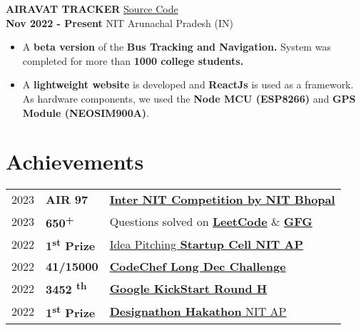 \documentclass[]{article}
\newenvironment{tightemize}{
\vspace{-\topsep}
\begin{itemize}\itemsep0pt \parskip2pt \parsep2pt}
{\end{itemize}}
\newcommand{\upper}[1]{
  \MakeUppercase{#1}
}
\newcommand{\projname}[2]{
  {\large{#1}
  \hfill \small{#2}} 
}
\newcommand{\loc}[2]{
  {\small{#1} 
  \hfill \small{#2}}
}
\begin{document}
\begin{multicols}{2}
\begin{flushleft}
    \projname{\textbf{\upper{{Airavat tracker}}}}{\href{https://github.com/tripathics/airavat-nodejs}{Source Code}} \\
    \loc{{\textbf{Nov 2022 - Present}}}{NIT Arunachal Pradesh (IN)}
    \begin{tightemize}
      \item  A \textbf{beta version} of the \textbf{Bus Tracking and Navigation.}
      System was completed for more than \textbf{1000 college
      students.}
      \item A \textbf{lightweight website} is developed and \textbf{ReactJs} is used as a framework. As hardware components, we used the \textbf{Node MCU (ESP8266)} and \textbf {GPS Module (NEOSIM900A)}.
    \end{tightemize}




    \section*{Achievements} 
    \begin{tabular}{rll}
    2023	     & \textbf{AIR 97}  & \href{https://drive.google.com/file/d/1atilxo1LnxKXvUW8hDytg__F1Dpe0FDC/view}{\textbf{Inter NIT Competition by NIT Bhopal}}\\
    2023 & \textbf{ 650\textsuperscript{+}} & Questions solved on \href{https://auth.geeksforgeeks.org/user/rahulsah6003/practice/}{\textbf{LeetCode}} \& \href{https://leetcode.com/rahulsah6003/}{\textbf{GFG}} \\
    2022	  &  \textbf{1\textsuperscript{st} Prize} & \href{https://drive.google.com/drive/folders/13uV6u1qge0kMAJ67J84DtnbJjgjbHjSGtBizGmAzotTOa0BFClvEWlYaDQQeQMJbOVtBXxCk}{Idea Pitching \textbf{Startup Cell NIT AP}} \\
    2022	     & \textbf{ 41/15000}  & \href{https://drive.google.com/file/d/1atilxo1LnxKXvUW8hDytg__F1Dpe0FDC/view}{\textbf{CodeChef Long Dec Challenge}}\\
    2022  & \textbf{3452 \textsuperscript{th}} & \href{https://drive.google.com/file/d/1BiwyVlzI5dh4EW5C9SVCS4j_vrKi3bdd/view}{\textbf{Google KickStart Round H}}\\
    2022	     &  \textbf{1\textsuperscript{st} Prize} & \href{https://drive.google.com/file/d/11MtJKzNPpVAdR6VWHuizrE2ros0bHbOS/view}{ \textbf{Designathon Hakathon} NIT AP} \\
    \end{tabular}


  \end{flushleft}



\end{multicols}
\end{document}
